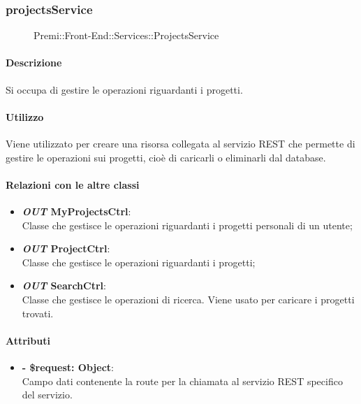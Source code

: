 \subsubsection{projectsService}
	\begin{figure}[h]
		\centering
		\caption[Premi::Front-End::Services::ProjectsService]{Premi::Front-End::Services::ProjectsService}
	\end{figure}
	
	\paragraph{Descrizione}
	Si occupa di gestire le operazioni riguardanti i progetti.
	
	\paragraph{Utilizzo}
	Viene utilizzato per creare una risorsa collegata al servizio REST che permette di gestire le operazioni sui progetti, cioè di caricarli o eliminarli dal database.
	
	\paragraph{Relazioni con le altre classi}
	\begin{itemize}
		\item \textbf{\textit{OUT} MyProjectsCtrl}:\\
			Classe che gestisce le operazioni riguardanti i progetti personali di un utente;
		\item \textbf{\textit{OUT} ProjectCtrl}:\\
			Classe che gestisce le operazioni riguardanti i progetti;
		\item \textbf{\textit{OUT} SearchCtrl}:\\
			Classe che gestisce le operazioni di ricerca. Viene usato per caricare i progetti trovati.
	\end{itemize}
	
	\paragraph{Attributi}
	\begin{itemize}
		\item \textbf{- \$request: Object}:\\
		Campo dati contenente la route per la chiamata al servizio REST specifico del servizio.
	\end{itemize}	
	
